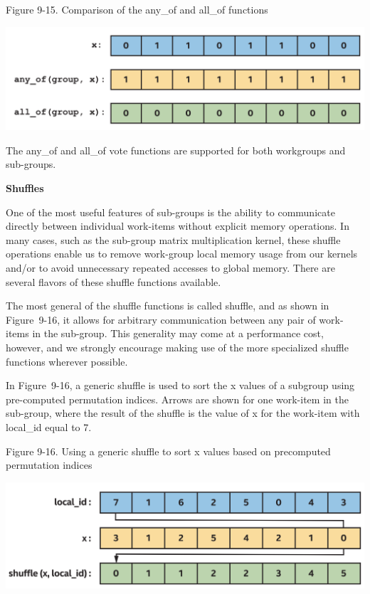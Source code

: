 \hspace*{\fill} \par %
Figure 9-15. Comparison of the any\_of and all\_of functions
\begin{center}
	\includegraphics[width=1.\textwidth]{content/chapter-9/images/8}
\end{center}

The any\_of and all\_of vote functions are supported for both workgroups and sub-groups.\par

\hspace*{\fill} \par %
\textbf{Shuffles}

One of the most useful features of sub-groups is the ability to communicate directly between individual work-items without explicit memory operations. In many cases, such as the sub-group matrix multiplication kernel, these shuffle operations enable us to remove work-group local memory usage from our kernels and/or to avoid unnecessary repeated accesses to global memory. There are several flavors of these shuffle functions available.\par

The most general of the shuffle functions is called shuffle, and as shown in Figure 9-16, it allows for arbitrary communication between any pair of work-items in the sub-group. This generality may come at a performance cost, however, and we strongly encourage making use of the more specialized shuffle functions wherever possible.\par

In Figure 9-16, a generic shuffle is used to sort the x values of a subgroup using pre-computed permutation indices. Arrows are shown for one work-item in the sub-group, where the result of the shuffle is the value of x for the work-item with local\_id equal to 7.\par

\hspace*{\fill} \par %
Figure 9-16. Using a generic shuffle to sort x values based on precomputed permutation indices
\begin{center}
	\includegraphics[width=1.\textwidth]{content/chapter-9/images/9}
\end{center}

